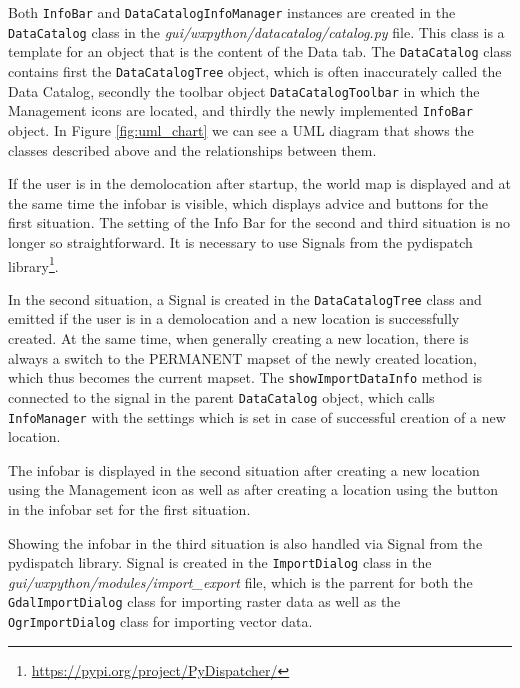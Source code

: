 \documentclass[a4paper,10pt,twoside]{article}
\begin{document}
Both \texttt{InfoBar} and \texttt{DataCatalogInfoManager} instances
are created in the \texttt{DataCatalog} class in the
\textit{gui/wxpython/datacatalog/catalog.py} file. This class is a
template for an object that is the content of the Data tab. The
\texttt{DataCatalog} class contains first the \texttt{DataCatalogTree}
object, which is often inaccurately called the Data Catalog, secondly
the toolbar object \texttt{DataCatalogToolbar} in which the Management
icons are located, and thirdly the newly implemented \texttt{InfoBar}
object. In Figure \ref{fig:uml_chart} we can see a UML diagram that
shows the classes described above and the relationships between them.

If the user is in the demolocation after startup, the world map is
displayed and at the same time the infobar is visible, which displays
advice and buttons for the first situation. The setting of the Info
Bar for the second and third situation is no longer so
straightforward. It is necessary to use Signals from the pydispatch
library\footnote{\url{https://pypi.org/project/PyDispatcher/}}.

In the second situation, a Signal is created in the
\texttt{DataCatalogTree} class and emitted if the user is in a
demolocation and a new location is successfully created. At the same
time, when generally creating a new location, there is always a switch
to the PERMANENT mapset of the newly created location, which thus
becomes the current mapset. The \texttt{showImportDataInfo} method is
connected to the signal in the parent \texttt{DataCatalog} object,
which calls \texttt{InfoManager} with the settings which is set in
case of successful creation of a new location. 

\newpage
\noindent The infobar is
displayed in the second situation after creating a new location using
the Management icon as well as after creating a location using the
button in the infobar set for the first situation.

Showing the infobar in the third situation is also handled via Signal
from the pydispatch library. Signal is created in the
\texttt{ImportDialog} class in the
\textit{gui/wxpython/modules/import\_export} file, which is the
parrent for both the \texttt{GdalImportDialog} class for importing
raster data as well as the \texttt{OgrImportDialog} class for
importing vector data.
\end{document}
